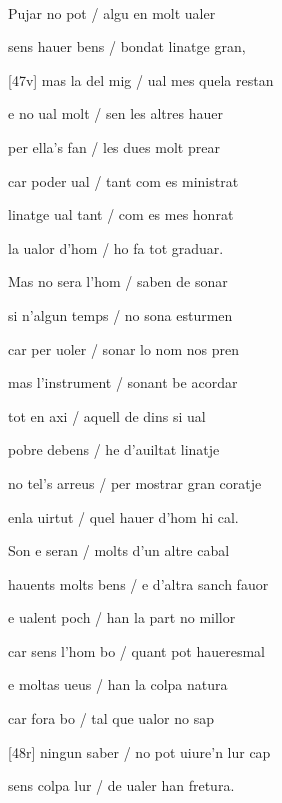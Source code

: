 \documentclass[12pt]{article}
\renewcommand{\espaiAbansEtiquetaPoema}{\vspace{0ex}}
\begin{document}
\begin{estrofa}

\espaiAbansEtiquetaPoema

\\

\end{estrofa}


\begin{estrofa}

 Pujar no pot / algu en molt ualer

 sens hauer bens / bondat linatge gran,

 [47v] mas la del mig / ual mes quela restan

 e no ual molt / sen les altres hauer

 per ella's fan / les dues molt prear

 car poder ual / tant com es ministrat

 linatge ual tant / com es mes honrat

 la ualor d'hom / ho fa tot graduar.

\end{estrofa}



\begin{estrofa}

 Mas no sera l'hom / saben de sonar

 si n'algun temps / no sona esturmen

 car per uoler / sonar lo nom nos pren

 mas l'instrument / sonant be acordar

 tot en axi / aquell de dins si ual

 pobre debens / he d'auiltat linatje

 no tel's arreus / per mostrar gran coratje

 enla uirtut / quel hauer d'hom hi cal.

\end{estrofa}



\begin{estrofa}

 Son e seran / molts d'un altre cabal

 hauents molts bens / e d'altra sanch fauor

 e ualent poch / han la part no millor

 car sens l'hom bo / quant pot haueresmal

 e moltas ueus / han la colpa natura

 car fora bo / tal que ualor no sap

 [48r] ningun saber / no pot uiure'n lur cap

 sens colpa lur / de ualer han fretura.

\end{estrofa}
\end{document}
